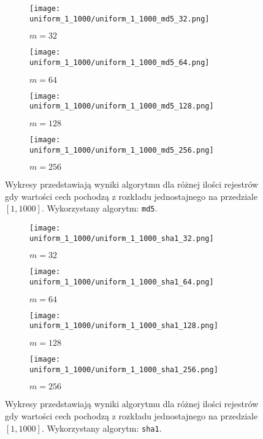 \begin{figure}[H]
    \begin{subfigure}{0.5\textwidth}
        \texttt{[image: uniform\_1\_1000/uniform\_1\_1000\_md5\_32.png]}
        \caption{$m = 32$}
        \label{fig:subim1}
    \end{subfigure}
    \begin{subfigure}{0.5\textwidth}
        \texttt{[image: uniform\_1\_1000/uniform\_1\_1000\_md5\_64.png]}
        \caption{$m = 64$}
        \label{fig:subim1}
    \end{subfigure}
    \begin{subfigure}{0.5\textwidth}
        \texttt{[image: uniform\_1\_1000/uniform\_1\_1000\_md5\_128.png]}
        \caption{$m = 128$}
        \label{fig:subim2}
    \end{subfigure}
    \begin{subfigure}{0.5\textwidth}
        \texttt{[image: uniform\_1\_1000/uniform\_1\_1000\_md5\_256.png]}
        \caption{$m = 256$}
        \label{fig:subim2}
    \end{subfigure}

    \caption{Wykresy przedstawiają wyniki algorytmu dla różnej ilości rejestrów gdy wartości cech pochodzą z rozkładu jednostajnego na przedziale $[1, 1000]$. Wykorzystany algorytm: \texttt{md5}.}
    \label{fig:uniform_md5}
\end{figure}

\begin{figure}[H]
    \begin{subfigure}{0.5\textwidth}
        \texttt{[image: uniform\_1\_1000/uniform\_1\_1000\_sha1\_32.png]}
        \caption{$m = 32$}
        \label{fig:subim1}
    \end{subfigure}
    \begin{subfigure}{0.5\textwidth}
        \texttt{[image: uniform\_1\_1000/uniform\_1\_1000\_sha1\_64.png]}
        \caption{$m = 64$}
        \label{fig:subim1}
    \end{subfigure}
    \begin{subfigure}{0.5\textwidth}
        \texttt{[image: uniform\_1\_1000/uniform\_1\_1000\_sha1\_128.png]}
        \caption{$m = 128$}
        \label{fig:subim2}
    \end{subfigure}
    \begin{subfigure}{0.5\textwidth}
        \texttt{[image: uniform\_1\_1000/uniform\_1\_1000\_sha1\_256.png]}
        \caption{$m = 256$}
        \label{fig:subim2}
    \end{subfigure}

    \caption{Wykresy przedstawiają wyniki algorytmu dla różnej ilości rejestrów gdy wartości cech pochodzą z rozkładu jednostajnego na przedziale $[1, 1000]$. Wykorzystany algorytm: \texttt{sha1}.}
    \label{fig:uniform_sha1}
\end{figure}

